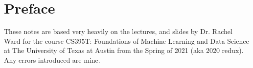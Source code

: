 \section{Preface}
These notes are based very heavily on the lectures, and slides by Dr. Rachel Ward for the course CS395T: Foundations of Machine Learning and Data Science at The University of Texas at Austin from the Spring of 2021 (aka 2020 redux). Any errors introduced are mine. 